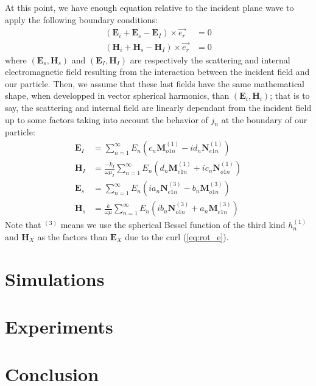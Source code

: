 \documentclass{article}
\begin{document}
At this point, we have enough equation relative to the incident plane wave to apply the following boundary conditions:
\begin{align}
(\textbf{E}_{i} + \textbf{E}_{s} - \textbf{E}_{I}) \times \overrightarrow{e_{r}} &= 0\\
(\textbf{H}_{i} + \textbf{H}_{s} - \textbf{H}_{I}) \times \overrightarrow{e_{r}} &= 0
\end{align}
where $(\textbf{E}_{s}, \textbf{H}_{s})$ and $(\textbf{E}_{I}, \textbf{H}_{I})$ are respectively the scattering and internal electromagnetic field resulting from the interaction between the incident field and our particle. Then, we assume that these last fields have the same mathematical shape, when developped in vector spherical harmonics, than $(\textbf{E}_{i}, \textbf{H}_{i})$; that is to say, the scattering and internal field are linearly dependant from the incident field up to some factors taking into account the behavior of $j_{n}$ at the boundary of our particle:
\begin{align}
\textbf{E}_{I}&=\sum_{n=1}^{\infty }E_{n}(c_{n}\textbf{M}^{(1)}_{o1n} - id_{n}\textbf{N}^{(1)}_{e1n})\\
\textbf{H}_{I}&=\frac{-k_{I}}{\omega\mu_{I}}\sum_{n=1}^{\infty }E_{n}(d_{n}\textbf{M}^{(1)}_{e1n} + ic_{n}\textbf{N}^{(1)}_{o1n})\\
\textbf{E}_{s}&=\sum_{n=1}^{\infty }E_{n}(ia_{n}\textbf{N}^{(3)}_{e1n} - b_{n}\textbf{M}^{(3)}_{o1n})\\
\textbf{H}_{s}&=\frac{k}{\omega\mu}\sum_{n=1}^{\infty }E_{n}(ib_{n}\textbf{N}^{(3)}_{o1n} + a_{n}\textbf{M}^{(3)}_{e1n})
\end{align}
Note that $^{(3)}$ means we use the spherical Bessel function of the third kind $h^{(1)}_{n}$ and $\textbf{H}_{X}$ as the factors than $\textbf{E}_{X}$ due to the curl (\ref{eq:rot_e}).

\section{Simulations}

\section{Experiments}

\section{Conclusion}
\end{document}
